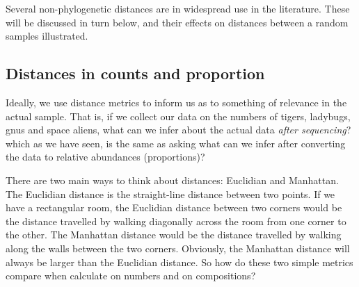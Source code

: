 \documentclass[twocolumn]{article}
\begin{document}
Several non-phylogenetic distances are in widespread use in the
literature. These will be discussed in turn below, and their effects on
distances between a random samples illustrated.

\subsection{Distances in counts and proportion}

Ideally, we use distance metrics to inform us as to something of
relevance in the actual sample. That is, if we collect our data on the
numbers of tigers, ladybugs, gnus and space aliens, what can we infer
about the actual data \emph{after  sequencing}? which as we have seen,
is the same as asking what can we infer after converting the data to
relative abundances (proportions)?

There are two main ways to think about distances: Euclidian and
Manhattan. The Euclidian distance is the straight-line distance between
two points. If we have a rectangular room, the Euclidian distance
between two corners would be the distance travelled by walking
diagonally across the room from one corner to the other. The Manhattan
distance would be the distance travelled by walking along the walls
between the two corners. Obviously, the Manhattan distance will always
be larger than the Euclidian distance. So how do these two simple
metrics compare when calculate on numbers and on compositions?
\end{document}
